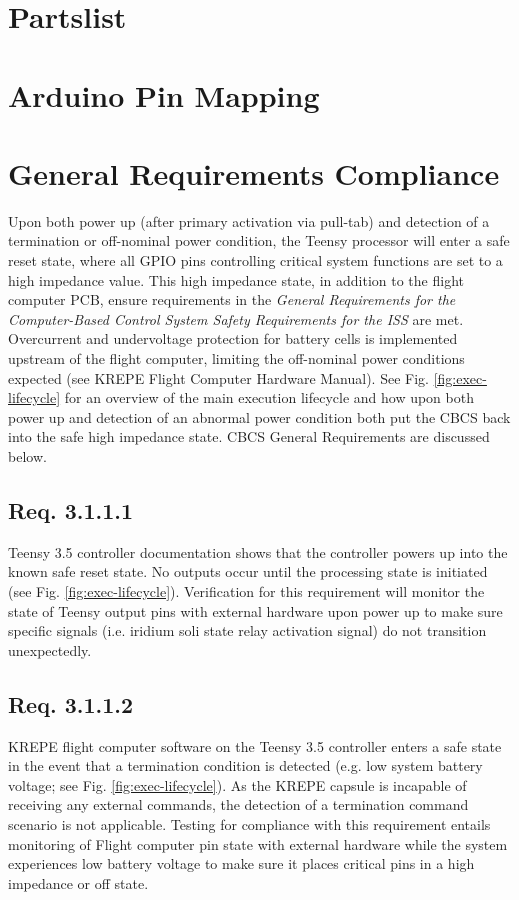 \documentclass{article}
\begin{document}
\section{Partslist}
\label{app:partslist}


\newpage
\section{Arduino Pin Mapping}
\label{app:pinmap}



\newpage
\section{General Requirements Compliance}
Upon both power up (after primary activation via pull-tab) and detection of a termination or off-nominal power condition, the Teensy processor will enter a safe reset state, where all GPIO pins controlling critical system functions are set to a high impedance value. This high impedance state, in addition to the flight computer PCB, ensure requirements in the \textit{General Requirements for the Computer-Based Control System Safety Requirements for the ISS} are met. Overcurrent and undervoltage protection for battery cells is implemented upstream of the flight computer, limiting the off-nominal power conditions expected (see KREPE Flight Computer Hardware Manual). See Fig. \ref{fig:exec-lifecycle} for an overview of the main execution lifecycle and how upon both power up and detection of an abnormal power condition both put the CBCS back into the safe high impedance state. CBCS General Requirements are discussed below.

\subsection{Req. 3.1.1.1}
Teensy 3.5 controller documentation shows that the controller powers up into the known safe reset state. No outputs occur until the processing state is initiated (see Fig. \ref{fig:exec-lifecycle}). Verification for this requirement will monitor the state of Teensy output pins with external hardware upon power up to make sure specific signals (i.e. iridium soli state relay activation signal) do not transition unexpectedly. 

\subsection{Req. 3.1.1.2}
KREPE flight computer software on the Teensy 3.5 controller enters a safe state in the event that a termination condition is detected (e.g. low system battery  voltage; see Fig. \ref{fig:exec-lifecycle}). As the KREPE capsule is incapable of receiving any external commands, the detection of a termination command scenario is not applicable. Testing for compliance with this requirement entails monitoring of Flight computer pin state with external hardware while the system experiences low battery voltage to make sure it places critical pins in a high impedance or off state.
\end{document}
